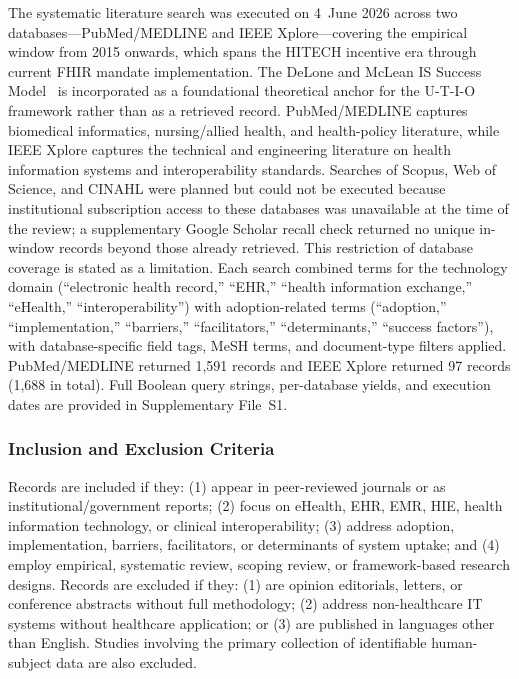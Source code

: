 The systematic literature search was executed on 4~June 2026 across two databases—PubMed/MEDLINE and IEEE Xplore—covering the empirical window from 2015 onwards, which spans the HITECH incentive era through current FHIR mandate implementation. The DeLone and McLean IS Success Model~\cite{delone2003model} is incorporated as a foundational theoretical anchor for the U-T-I-O framework rather than as a retrieved record. PubMed/MEDLINE captures biomedical informatics, nursing/allied health, and health-policy literature, while IEEE Xplore captures the technical and engineering literature on health information systems and interoperability standards. Searches of Scopus, Web of Science, and CINAHL were planned but could not be executed because institutional subscription access to these databases was unavailable at the time of the review; a supplementary Google Scholar recall check returned no unique in-window records beyond those already retrieved. This restriction of database coverage is stated as a limitation. Each search combined terms for the technology domain (``electronic health record,'' ``EHR,'' ``health information exchange,'' ``eHealth,'' ``interoperability'') with adoption-related terms (``adoption,'' ``implementation,'' ``barriers,'' ``facilitators,'' ``determinants,'' ``success factors''), with database-specific field tags, MeSH terms, and document-type filters applied. PubMed/MEDLINE returned 1,591 records and IEEE Xplore returned 97 records (1,688 in total). Full Boolean query strings, per-database yields, and execution dates are provided in Supplementary File~S1.

\subsubsection{Inclusion and Exclusion Criteria}

Records are included if they: (1) appear in peer-reviewed journals or as institutional/government reports; (2) focus on eHealth, EHR, EMR, HIE, health information technology, or clinical interoperability; (3) address adoption, implementation, barriers, facilitators, or determinants of system uptake; and (4) employ empirical, systematic review, scoping review, or framework-based research designs. Records are excluded if they: (1) are opinion editorials, letters, or conference abstracts without full methodology; (2) address non-healthcare IT systems without healthcare application; or (3) are published in languages other than English. Studies involving the primary collection of identifiable human-subject data are also excluded.

